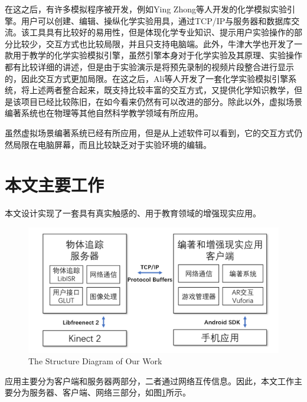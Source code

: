 在这之后，有许多模拟程序被开发，例如Ying Zhong等人开发的化学模拟实验引擎。\cite{zhong2014domain}用户可以创建、编辑、操纵化学实验用具，通过TCP/IP与服务器和数据库交流。该工具具有比较好的易用性，但是体现化学专业知识、提示用户实验操作的部分比较少，交互方式也比较局限，并且只支持电脑端。此外，牛津大学也开发了一款用于教学的化学实验模拟引擎，虽然引擎本身对于化学实验及其原理、实验操作都有比较详细的讲述，但是由于实验演示是将预先录制的视频片段整合进行显示的，因此交互方式更加局限。\cite{OxfordChe}在这之后，Ali等人开发了一套化学实验模拟引擎系统，\cite{ali2014effect}将上述两者整合起来，既支持比较丰富的交互方式，又提供化学知识教学，但是该项目已经比较陈旧，在如今看来仍然有可以改进的部分。除此以外，虚拟场景编著系统也在物理等其他自然科学教学领域有所应用。\cite{daineko2017using}

虽然虚拟场景编著系统已经有所应用，但是从上述软件可以看到，它的交互方式仍然局限在电脑屏幕，而且比较缺乏对于实验环境的编辑。

\section{本文主要工作}
本文设计实现了一套具有真实触感的、用于教育领域的增强现实应用。

\begin{figure}[!htp]
  \centering
  \includegraphics[width=12cm]{figure/work.png}
    {The Structure Diagram of Our Work}
 \label{fig:work}
\end{figure}

应用主要分为客户端和服务器两部分，二者通过网络互传信息。因此，本文工作主要分为服务器、客户端、网络三部分，如图\ref{fig:work}所示。

